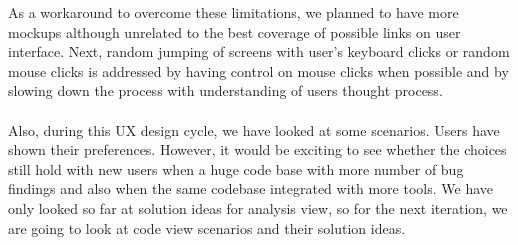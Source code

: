 As a workaround to overcome these limitations, we planned to have more mockups although unrelated to the best coverage of possible links on user interface. Next, random jumping of screens with user's keyboard clicks or random mouse clicks is addressed by having control on mouse clicks when possible and by slowing down the process with understanding of users thought process. \\ \\

Also, during this UX design cycle, we have looked at some scenarios. Users have shown their preferences. However, it would be exciting to see whether the choices still hold with new users when a huge code base with more number of bug findings and also when the same codebase integrated with more tools. We have only looked so far at solution ideas for analysis view, so for the next iteration, we are going to look at code view scenarios and their solution ideas.

\let\cleardoublepage\clearpage
